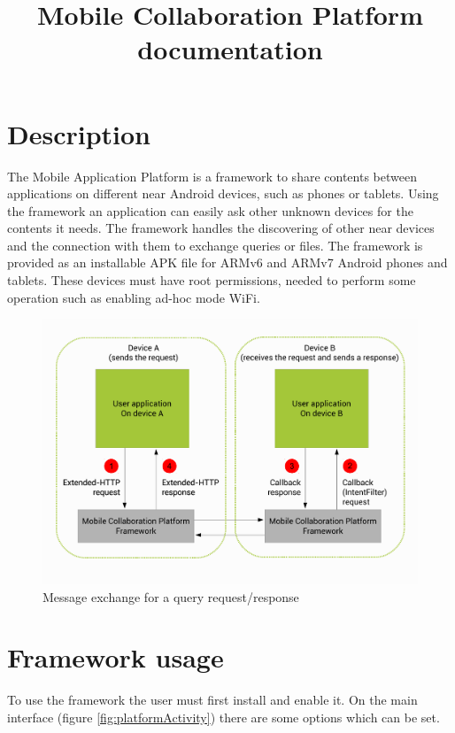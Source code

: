 \documentclass[12pt, a4paper, oneside]{book}
\begin{document}
\title{\Huge{Mobile Collaboration Platform}\\\Large{documentation}}
\maketitle
\tableofcontents


\chapter{Description}

The Mobile Application Platform is a framework to share contents between applications on different near Android devices, such as phones or tablets. Using the framework an application can easily ask other unknown devices for the contents it needs.
The framework handles the discovering of other near devices and the connection with them to exchange queries or files.
The framework is provided as an installable APK file for ARMv6 and ARMv7 Android phones and tablets. These devices must have root permissions, needed to perform some operation such as enabling ad-hoc mode WiFi.

\begin{figure}[h!]
\centering
\includegraphics[scale=0.6]{images/SchemaFrameworkAltoLivello.pdf}
\caption{Message exchange for a query request/response}
\label{fig:platformSchemeQueryRequestResponse}
\end{figure}

\chapter{Framework usage}
To use the framework the user must first install and enable it. On the main interface (figure \ref{fig:platformActivity}) there are some options which can be set.
\end{document}
